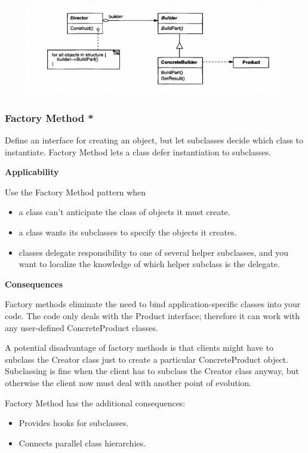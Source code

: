 \documentclass{article}
\begin{document}
\begin{figure}[h]
    \centering
    \includegraphics[width=14cm]{diagrams/patterns-2-builder.png}
\end{figure}



\newpage
\subsubsection{Factory Method *}
Define an interface for creating an object, but let subclasses decide which class to instantiate. Factory Method lets a class defer instantiation to subclasses.


\textbf{Applicability}

Use the Factory Method pattern when
\begin{itemize}
    \item a class can't anticipate the class of objects it must create.
    \item a class wants its subclasses to specify the objects it creates.
    \item classes delegate responsibility to one of several helper subclasses, and you want to localize the knowledge of which helper subclass is the delegate.
\end{itemize}

\textbf{Consequences}

Factory methods eliminate the need to bind application-specific classes into your code. The code only deals with the Product interface; therefore it can work with any user-defined ConcreteProduct classes.

A potential disadvantage of factory methods is that clients might have to subclass the Creator class just to create a particular ConcreteProduct object. Subclassing is fine when the client has to subclass the Creator class anyway, but otherwise the client now must deal with another point of evolution.

Factory Method has the additional consequences:
\begin{itemize}
    \item Provides hooks for subclasses.
    \item Connects parallel class hierarchies.
\end{itemize}
\end{document}
